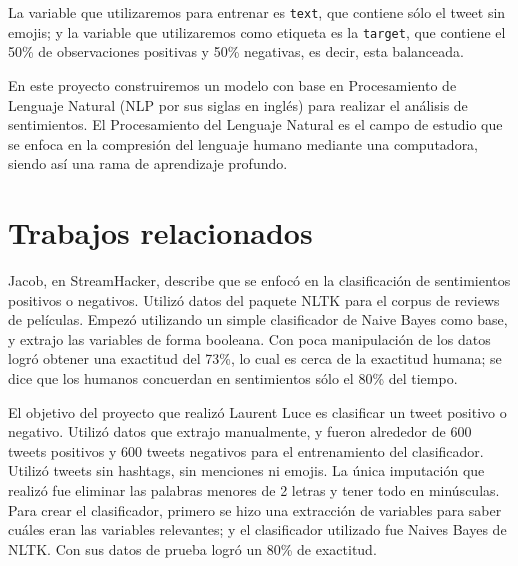 \documentclass[sigconf, nonacm, spanish]{acmart}
\begin{document}
La variable que utilizaremos para entrenar es \texttt{text}, que contiene sólo el tweet sin emojis; y la variable que utilizaremos como etiqueta es la \texttt{target}, que contiene el 50\% de observaciones positivas y 50\% negativas, es decir, esta balanceada.

En este proyecto construiremos un modelo con base en Procesamiento de Lenguaje Natural (NLP por sus siglas en inglés) para realizar el análisis de sentimientos. El Procesamiento del Lenguaje Natural es el campo de estudio que se enfoca en la compresión del lenguaje humano mediante una computadora, siendo así una rama de aprendizaje profundo.

\section{Trabajos relacionados}



Jacob, en StreamHacker\cite{Jacob}, describe que se enfocó en la clasificación de sentimientos positivos o negativos. Utilizó datos del paquete NLTK para el corpus de reviews de películas. Empezó utilizando un simple clasificador de Naive Bayes como base, y extrajo las variables de forma booleana. Con poca manipulación de los datos logró obtener una exactitud del 73\%, lo cual es cerca de la exactitud humana; se dice que los humanos concuerdan en sentimientos sólo el 80\% del tiempo.

El objetivo del proyecto que realizó Laurent Luce\cite{Laurent} es clasificar un tweet positivo o negativo. Utilizó datos que extrajo manualmente, y fueron alrededor de 600 tweets positivos y 600 tweets negativos para el entrenamiento del clasificador. Utilizó tweets sin hashtags, sin menciones ni emojis. La única imputación que realizó fue eliminar las palabras menores de 2 letras y tener todo en minúsculas. Para crear el clasificador, primero se hizo una extracción de variables para saber cuáles eran las variables relevantes; y el clasificador utilizado fue Naives Bayes de NLTK. Con sus datos de prueba logró un 80\% de exactitud.
\end{document}
